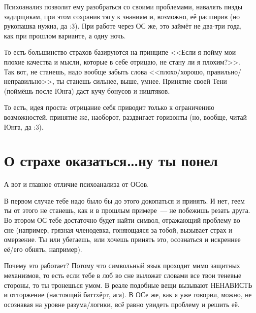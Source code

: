 \documentclass[a5paper,12pt,twoside]{memoir}
\begin{document}
Психоанализ позволит ему разобраться со своими проблемами, навалять пизды задирщикам, при этом сохранив тягу к знаниям и, возможно, её расширив (но рукопашка нужна, да :3).
При работе через ОС же, это займёт не два-три года, как при прошлом варианте, а одну ночь.

То есть большинство страхов базируются на принципе <<Если я пойму мои плохие качества и мысли, которые в себе отрицаю, не стану ли я плохим?>>. Так вот, не станешь, надо вообще забыть слова <<плохо/хорошо, правильно/неправильно>>, ты станешь сильнее, выше, умнее. Принятие своей Тени (поймёшь после Юнга) даст кучу бонусов и ништяков. 

То есть, идея проста: отрицание себя приводит только к ограничению возможностей, принятие же, наоборот, раздвигает горизонты (но, вообще, читай Юнга, да :3).




\section{О страхе оказаться\ldots ну ты понел}

\medskip
А вот и главное отличие психоанализа от ОСов. 

В первом случае тебе надо было бы до этого докопаться и принять. И нет, геем ты от этого не станешь, как и в прошлым примере~--- не побежишь резать друга. Во втором ОС тебе достаточно будет найти символ, отражающий проблему во сне (например, грязная членодевка, гоняющаяся за тобой, вызывает страх и омерзение. Ты или убегаешь, или хочешь принять это, осознаться и искреннее её/его обнять, например).

Почему это работает? Потому что символьный я\-зык проходит мимо защитных механизмов, то есть если тебе в лоб во сне выложат словами все твои теневые стороны, то ты тронешься умом. В реале подобные вещи вызывают НЕНАВИСТЬ и отторжение (настоящий баттхёрт, ага). В ОСе же, как я уже говорил, можно, не осознавая на уровне разума/логики, всё равно увидеть проблему и решить её. 
\end{document}
